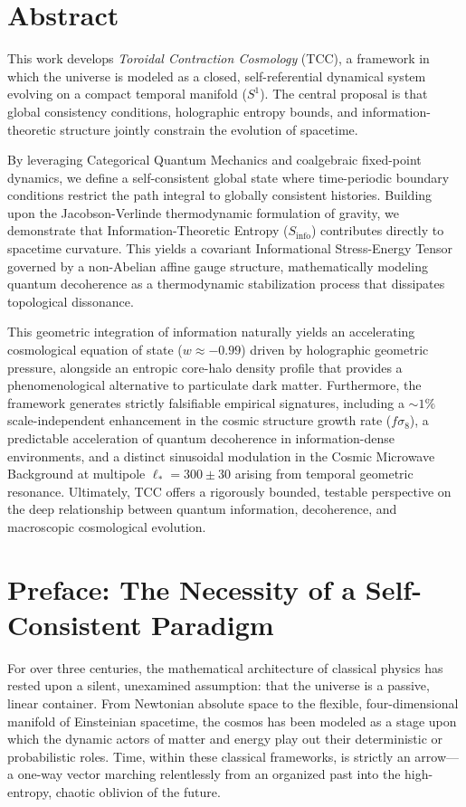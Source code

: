 \documentclass[12pt,openany]{book}
\theoremstyle{plain}
\theoremstyle{definition}
\theoremstyle{remark}
\begin{document}
\chapter{Abstract}

This work develops \emph{Toroidal Contraction Cosmology} (TCC), a framework in which the universe is modeled as a closed, self-referential dynamical system evolving on a compact temporal manifold ($S^1$). The central proposal is that global consistency conditions, holographic entropy bounds, and information-theoretic structure jointly constrain the evolution of spacetime.

By leveraging Categorical Quantum Mechanics and coalgebraic fixed-point dynamics, we define a self-consistent global state where time-periodic boundary conditions restrict the path integral to globally consistent histories. Building upon the Jacobson-Verlinde thermodynamic formulation of gravity, we demonstrate that Information-Theoretic Entropy ($S_{\mathrm{info}}$) contributes directly to spacetime curvature. This yields a covariant Informational Stress-Energy Tensor governed by a non-Abelian affine gauge structure, mathematically modeling quantum decoherence as a thermodynamic stabilization process that dissipates topological dissonance.

This geometric integration of information naturally yields an accelerating cosmological equation of state ($w \approx -0.99$) driven by holographic geometric pressure, alongside an entropic core-halo density profile that provides a phenomenological alternative to particulate dark matter. Furthermore, the framework generates strictly falsifiable empirical signatures, including a $\sim 1\%$ scale-independent enhancement in the cosmic structure growth rate ($f\sigma_8$), a predictable acceleration of quantum decoherence in information-dense environments, and a distinct sinusoidal modulation in the Cosmic Microwave Background at multipole $\ell_* = 300 \pm 30$ arising from temporal geometric resonance. Ultimately, TCC offers a rigorously bounded, testable perspective on the deep relationship between quantum information, decoherence, and macroscopic cosmological evolution.

\chapter{Preface: The Necessity of a Self-Consistent Paradigm}

For over three centuries, the mathematical architecture of classical physics has rested upon a silent, unexamined assumption: that the universe is a passive, linear container. From Newtonian absolute space to the flexible, four-dimensional manifold of Einsteinian spacetime, the cosmos has been modeled as a stage upon which the dynamic actors of matter and energy play out their deterministic or probabilistic roles. Time, within these classical frameworks, is strictly an arrow---a one-way vector marching relentlessly from an organized past into the high-entropy, chaotic oblivion of the future. 
\end{document}
